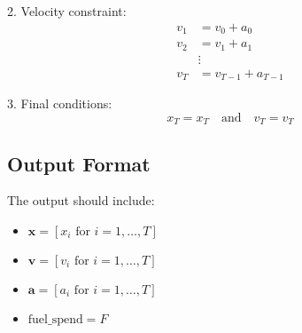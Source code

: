 \documentclass{article}
\begin{document}
2. Velocity constraint:
   \[
   \begin{aligned}
   v_1 & = v_0 + a_0 \\
   v_2 & = v_1 + a_1 \\
   & \vdots \\
   v_T & = v_{T-1} + a_{T-1}
   \end{aligned}
   \]
   
3. Final conditions:
   \[
   x_T = x_T \quad \text{and} \quad v_T = v_T
   \]

\subsection*{Output Format}

The output should include:

\begin{itemize}
    \item \( \mathbf{x} = [x_i \text{ for } i = 1, \ldots, T] \)
    \item \( \mathbf{v} = [v_i \text{ for } i = 1, \ldots, T] \)
    \item \( \mathbf{a} = [a_i \text{ for } i = 1, \ldots, T] \)
    \item \( \text{fuel\_spend} = F \)
\end{itemize}
\end{document}
